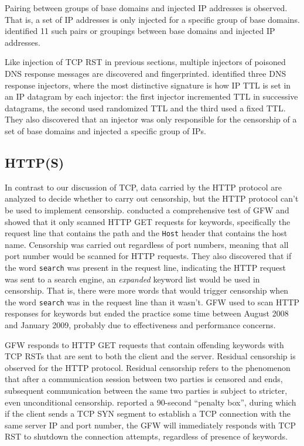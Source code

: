\documentclass[sigconf, screen, balance=false]{acmart}
\begin{document}
Pairing between groups of base domains and injected IP addresses is observed. That is, a set of IP addresses is only injected for a specific group of base domains. \citeauthor{nguyen2021how} identified 11 such pairs or groupings between base domains and injected IP addresses.

Like injection of TCP RST in previous sections, multiple injectors of poisoned DNS response messages are discovered and fingerprinted. \citeauthor{anonymous2020triplet} identified three DNS response injectors, where the most distinctive signature is how IP TTL is set in an IP datagram by each injector: the first injector incremented TTL in successive datagrams, the second used randomized TTL and the third used a fixed TTL. They also discovered that an injector was only responsible for the censorship of a set of base domains and injected a specific group of IPs.

\subsection{HTTP(S)}

In contrast to our discussion of TCP, data carried by the HTTP protocol are analyzed to decide whether to carry out censorship, but the HTTP protocol can't be used to implement censorship. \citeauthor{weinberg2021chinese} conducted a comprehensive test of GFW and showed that it only scanned HTTP GET requests for keywords, specifically the request line that contains the path and the \texttt{Host} header that contains the host name. Censorship was carried out regardless of port numbers, meaning that all port number would be scanned for HTTP requests. They also discovered that if the word \texttt{search} was present in the request line, indicating the HTTP request was sent to a search engine, an \emph{expanded} keyword list would be used in censorship. That is, there were more words that would trigger censorship when the word \texttt{search} was in the request line than it wasn't. GFW used to scan HTTP responses for keywords but ended the practice some time between August 2008 and January 2009, probably due to effectiveness and performance concerns. \cite{park2010empirical}

GFW responds to HTTP GET requests that contain offending keywords with TCP RSTs that are sent to both the client and the server. Residual censorship is observed for the HTTP protocol. Residual censorship refers to the phenomenon that after a communication session between two parties is censored and ends, subsequent communication between the same two parties is subject to stricter, even unconditional censorship. \citeauthor{weinberg2021chinese} reported a 90-second ``penalty box'', during which if the client sends a TCP SYN segment to establish a TCP connection with the same server IP and port number, the GFW will immediately responds with TCP RST to shutdown the connection attempts, regardless of presence of keywords.
\end{document}
